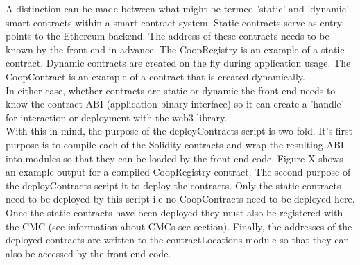 A distinction can be made between what might be termed 'static' and 'dynamic' smart contracts within a smart contract system. Static contracts serve as entry points to the Ethereum backend. The address of these contracts needs to be known by the front end in advance. The CoopRegistry is an example of a static contract. Dynamic contracts are created on the fly during application usage. The CoopContract is an example of a contract that is created dynamically. \\

In either case, whether contracts are static or dynamic the front end needs to know the contract ABI (application binary interface) so it can create a 'handle' for interaction or deployment with the web3 library.\\

With this in mind, the purpose of the deployContracts script is two fold. It's first purpose is to compile each of the Solidity contracts and wrap the resulting ABI into modules so that they can be loaded by the front end code. Figure X shows an example output for a compiled CoopRegistry contract. The second purpose of the deployContracts script it to deploy the contracts. Only the static contracts need to be deployed by this script i.e no CoopContracts need to be deployed here. Once the static contracts have been deployed they must also be registered with the CMC (see information about CMCs see section). Finally, the addresses of the deployed contracts are written to the contractLocations module so that they can also be accessed by the front end code. \\

